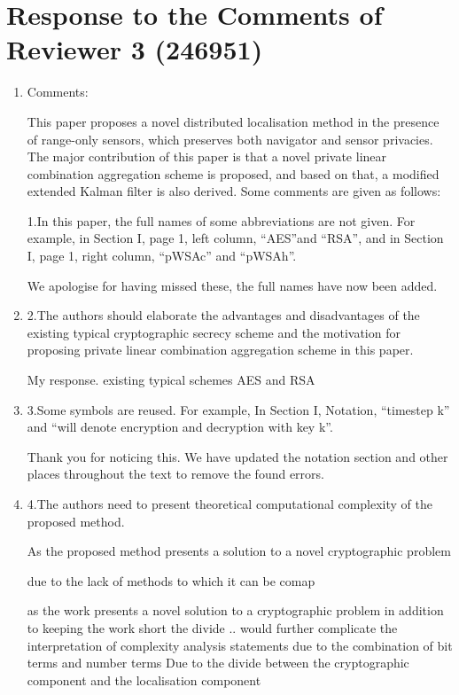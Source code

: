 \documentclass[a4paper]{scrartcl}
\newenvironment{rebuttal}{\begin{enumerate}[label={\color{grey}\thesection.\arabic{enumi}},leftmargin=0pt,ref=\thesection.\arabic{enumi}]}{\end{enumerate}}
\newcommand{\reviewtext}[1]{{\color{nblue} #1}}
\begin{document}
\section*{Response to the Comments of Reviewer 3 (246951)}
\def\thesection{R3}
\begin{rebuttal}
\item \reviewtext{Comments:

This paper proposes a novel distributed localisation method in the presence of range-only sensors, which preserves both navigator and sensor privacies. The major contribution of this paper is that a novel private linear combination aggregation scheme is proposed, and based on that, a modified extended Kalman filter is also derived. Some comments are given as follows:

1.In this paper, the full names of some abbreviations are not given. For example, in Section I, page 1, left column, “AES”and “RSA”, and in Section I, page 1, right column, “pWSAc” and “pWSAh”.}

We apologise for having missed these, the full names have now been added.

\item \reviewtext{2.The authors should elaborate the advantages and disadvantages of the existing typical cryptographic secrecy scheme and the motivation for proposing private linear combination aggregation scheme in this paper.}

My response.
existing typical schemes AES and RSA

\item \reviewtext{3.Some symbols are reused. For example, In Section I, Notation, “timestep k” and “will denote encryption and decryption with key k”.}

Thank you for noticing this. We have updated the notation section and other places throughout the text to remove the found errors.

\item \reviewtext{4.The authors need to present theoretical computational complexity of the proposed method.}

As the proposed method presents a solution to a novel cryptographic problem

due to the lack of methods to which it can be comap

as the work presents a novel solution to a cryptographic problem
in addition to keeping the work short
the divide .. would further complicate the interpretation of complexity analysis statements due to the combination of bit terms and number terms
Due to the divide between the cryptographic component and the localisation component


\end{rebuttal}
\end{document}
